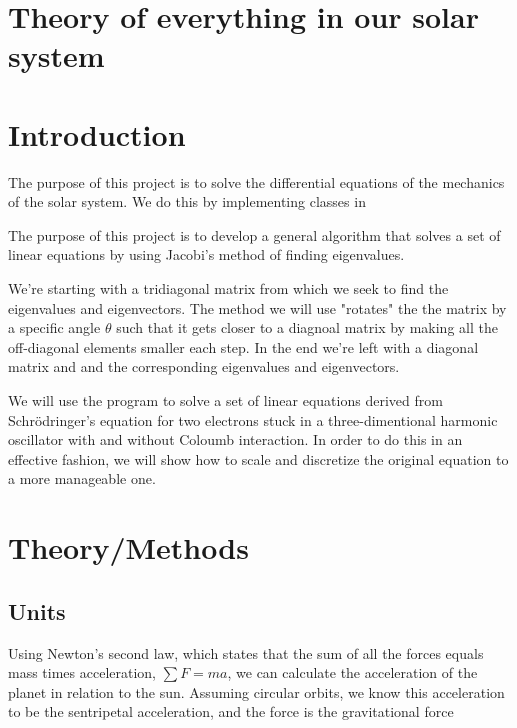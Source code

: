 \documentclass[10pt]{article}
\begin{document}
\begin{multicols}{2}

\section{Theory of everything in our solar system}

\section{Introduction}
The purpose of this project is to solve the differential equations of the
mechanics of the solar system. We do this by implementing classes in 

    The purpose of this project is to develop a general algorithm that
    solves a set of linear equations by using Jacobi's method of finding
    eigenvalues. 

We're starting with a tridiagonal matrix from which we seek to find the
eigenvalues and eigenvectors. The method we will use "rotates" the the
matrix by a specific angle $\theta$ such that it gets closer to a diagnoal
matrix by making all the off-diagonal elements smaller each step. In the
end we're left with a diagonal matrix and and the corresponding eigenvalues
and eigenvectors.

We will use the program to solve a set of linear equations derived from
Schrödringer's equation for two electrons stuck in a three-dimentional
harmonic oscillator with and without Coloumb interaction. In order to do
this in an effective fashion, we will show how to scale and discretize the
original equation to a more manageable one.



\section{Theory/Methods}
\subsection{Units}
Using Newton's second law, which states that the sum of all the forces
equals mass times acceleration, $\sum F=ma$, we can calculate the
acceleration of the planet in relation to the sun. Assuming circular
orbits, we know this acceleration to be the sentripetal acceleration, and
the force is the gravitational force


\end{multicols}
\end{document}
